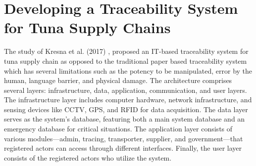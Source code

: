\section{Developing a Traceability System for Tuna Supply Chains}

The study of Kresna et al. (2017) \nocite{rrl-DTSTSC1}, proposed an IT-based traceability system for tuna supply chain as opposed to the traditional paper based traceability system which has several limitations such as the potency to be manipulated, error by the human, language barrier, and physical damage. The architecture comprises several layers: infrastructure, data, application, communication, and user layers. The infrastructure layer includes computer hardware, network infrastructure, and sensing devices like CCTV, GPS, and RFID for data acquisition. The data layer serves as the system's database, featuring both a main system database and an emergency database for critical situations. The application layer consists of various modules—admin, tracing, transporter, supplier, and government—that registered actors can access through different interfaces. Finally, the user layer consists of the registered actors who utilize the system.

